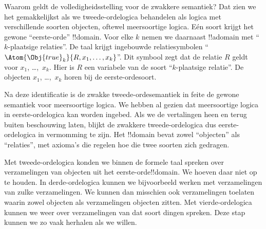 \documentclass[openany]{memoir}
\begin{document}
Waarom geldt de volledigheidsstelling voor de zwakkere semantiek? Dat zien we
het gemakkelijkst als we tweede-ordelogica behandelen als logica met
verschillende soorten objecten, oftewel meersoortige logica. Eén soort krijgt
het gewone ``eerste-orde'' !!{domain}. Voor elke $k$ nemen we daarnaast
!!a{domain} met ``$k$-plaatsige relaties''. De taal krijgt ingebouwde
relatiesymbolen ``$\Atom{\Obj{true}_k}{R,x_1,\dots,x_k}$''. Dit symbool zegt
dat de relatie $R$ geldt voor $x_1$, \dots,~$x_k$. Hier is $R$ een variabele
van de soort ``$k$-plaatsige relatie''. De objecten $x_1$, \dots,~$x_k$
horen bij de eerste-ordesoort.

Na deze identificatie is de zwakke tweede-ordesemantiek in feite de gewone
semantiek voor meersoortige logica. We hebben al gezien dat meersoortige
logica in eerste-ordelogica kan worden ingebed. Als we de vertalingen heen en
terug buiten beschouwing laten, blijkt de zwakkere tweede-ordelogica dus
eerste-ordelogica in vermomming te zijn. Het !!{domain} bevat zowel
``objecten'' als ``relaties'', met axioma's die regelen hoe die twee soorten
zich gedragen.
\endgroup

\begingroup
\def\olfilename{OLP-0178}
\def\olfilepath{content/first-order-logic/beyond/}
\hypertarget{unit-OLP-0178}{}





Met tweede-ordelogica konden we binnen de formele taal spreken over
verzamelingen van objecten uit het eerste-orde!!{domain}. We hoeven daar niet
op te houden. In derde-ordelogica kunnen we bijvoorbeeld werken met
verzamelingen van zulke verzamelingen. We kunnen dan misschien ook
verzamelingen toelaten waarin zowel objecten als verzamelingen objecten zitten.
Met vierde-ordelogica kunnen we weer over verzamelingen van dat soort dingen
spreken. Deze stap kunnen we zo vaak herhalen als we willen.
\end{document}
